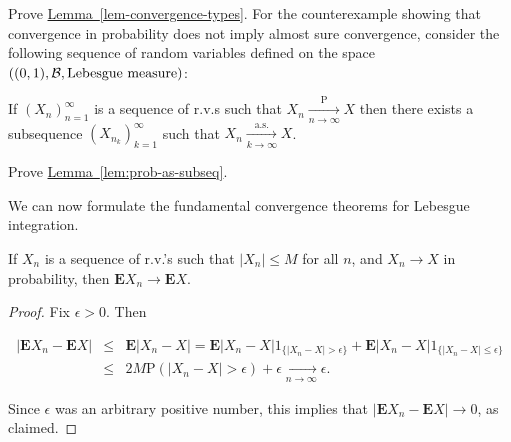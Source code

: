 \begin{xexercise}
Prove \hyperref[lem-convergence-types]{Lemma~\ref*{lem-convergence-types}}. For the
counterexample showing that convergence in probability
does not imply almost sure convergence, consider the
following sequence of random variables defined on the
space $((0,1),{\cal B}, \textrm{Lebesgue measure})$:

\begin{center}
\end{center}

\end{xexercise}

\begin{lem}
\label{lem:prob-as-subseq}
If $(X_n)_{n=1}^\infty$ is a sequence of r.v.s such
that $X_n \xrightarrow[n\to\infty]{\mathrm{P}} X$
then there exists a subsequence
$(X_{n_k})_{k=1}^\infty$ such that
$X_n \xrightarrow[k\to\infty]{\textrm{a.s.}} X$.
\end{lem}

\begin{xexercise}
Prove \hyperref[lem:prob-as-subseq]{Lemma~\ref*{lem:prob-as-subseq}}.
\end{xexercise}

\noindent We can now formulate the fundamental convergence
theorems for Lebesgue integration.

\begin{thm}
If $X_n$ is a sequence of r.v.'s such that
$|X_n|\le M$ for all $n$, and $X_n\to X$ in
probability, then $\mathbf{E} X_n \to \mathbf{E} X$.
\end{thm}

\begin{proof}
Fix $\epsilon>0$. Then

\begin{eqnarray*}
|\mathbf{E} X_n - \mathbf{E} X| &\le& \mathbf{E} |X_n - X| = \mathbf{E} |X_n - X|1_{\{|X_n-X|>\epsilon\}} + \mathbf{E} |X_n - X|1_{\{|X_n-X|\le \epsilon\}} \\
&\le& 2M \mathrm{P}(|X_n-X|>\epsilon) + \epsilon\xrightarrow[n\to\infty]{} \epsilon.
\end{eqnarray*}

\noindent Since $\epsilon$ was an arbitrary positive number,
this implies that
$|\mathbf{E} X_n-\mathbf{E} X|\to 0$, as claimed.
\end{proof}

